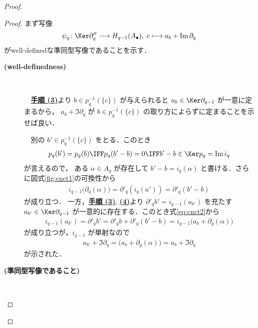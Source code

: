 \documentclass[algtopo_main]{subfiles}
\begin{document}
\begin{proof}
    \begin{proof}
        まず写像
            \begin{align}
                \label{eq:preconne}
                \psi_q \colon \Ker \partial''_q \lto H_{q-1}(A_\bullet),\; c \lmto a_b + \Im \partial_q
            \end{align}
        がwell-definedな準同型写像であることを示す．
        \begin{description}
            \item[\textbf{(well-definedness)}]　
            
            　\hyperref[pro:3]{\textbf{手順 (3)}}より $b \in p_q^{-1}(\{c\})$ が与えられると $a_b \in \Ker \partial_{q-1}$ が一意に定まるから，
            $a_b + \Im \partial_q$ が $b \in p_q^{-1}(\{c\})$ の取り方によらずに定まることを示せば良い．

            　別の $b' \in p_q^{-1}(\{c\})$ をとる．このとき
            \begin{align}
                p_q(b') = p_q(b) \IFF p_q (b' -b) = 0 \IFF b' - b \in \Ker p_q = \Im i_q
            \end{align}
            が言えるので，
            ある $\alpha \in A_q$ が存在して $b' - b = i_q(\alpha)$ と書ける．さらに図式\ref{fig:cnct1}の可換性から
            \begin{align}
                \label{eq:cnct2}
                i_{q-1} \bigl(\partial_q(\alpha)\bigr) = \partial'_q (i_q(a')) = \partial'_q (b' - b)
            \end{align}
            が成り立つ．
            一方，\hyperref[pro:3]{\textbf{手順 (3)}}, \hyperref[pro:4]{\textbf{(4)}}より $\partial'_q b' = i_{q-1}(a_{b'})$ を充たす $a_{b'} \in \Ker \partial_{q-1}$ が一意的に存在する．このとき式\eqref{eq:cnct2}から
            \begin{align}
                i_{q-1}(a_{b'}) = \partial'_q b' = \partial'_q b + \partial'_q(b'-b) = i_{q-1}\bigl(a_b + \partial_q(\alpha)\bigr)
            \end{align}
            が成り立つが，$i_{q-1}$ が単射なので
            \begin{align}
                a_{b'} + \Im \partial_q = \bigl(a_b + \partial_q(\alpha)\bigr) = a_b + \Im \partial_q
            \end{align}
            が示された．

            \item[\textbf{(準同型写像であること)}] 　


\end{description}
\end{proof}
\end{proof}
\end{document}
